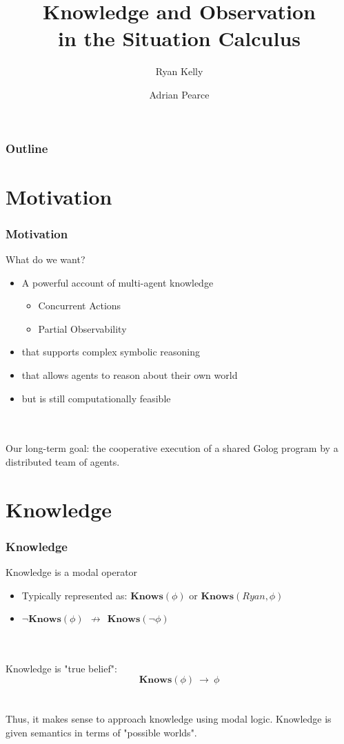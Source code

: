\documentclass{beamer}
\title{Knowledge and Observation\\ in the Situation Calculus}
\author[Ryan Kelly (rfk@csse.unimelb.edu.au)]{Ryan Kelly \and Adrian Pearce}
\begin{document}
\begin{frame}
  \titlepage
\end{frame}

\begin{frame}
  \frametitle{Outline}
  \tableofcontents
\end{frame}

\section{Motivation}

\begin{frame}
\frametitle{Motivation}
What do we want?
\begin{itemize}
\item A powerful account of multi-agent knowledge
  \begin{itemize}
  \item Concurrent Actions
  \item Partial Observability
  \end{itemize}
\item that supports complex symbolic reasoning
\item that allows agents to reason about their own world
\item but is still computationally feasible
\end{itemize}
\ \\
\ \\
\pause
Our long-term goal: the cooperative execution of a shared Golog program
by a distributed team of agents.
\end{frame}


\section{Knowledge}

\begin{frame}
\frametitle{Knowledge}

Knowledge is a modal operator
\begin{itemize}
\item Typically represented as: $\mathbf{Knows}(\phi)$ or $\mathbf{Knows}(Ryan,\phi)$
\item $\neg\mathbf{Knows}(\phi)\ \ \not\rightarrow\ \ \mathbf{Knows}(\neg\phi)$
\end{itemize}
\ \\
\ \\
Knowledge is "true belief":
\[ \mathbf{Knows}(\phi)\ \rightarrow\ \phi \]
\ \\
\ \\
Thus, it makes sense to approach knowledge using modal logic.
Knowledge is given semantics in terms of "possible worlds".

\end{frame}
\end{document}
